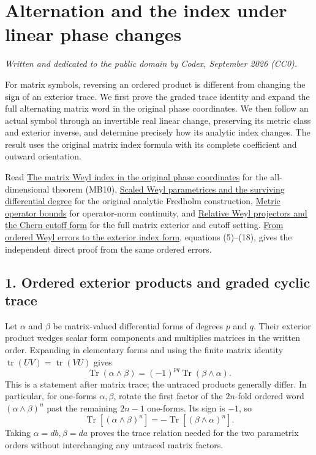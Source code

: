 \documentclass[
  11pt,
]{article}
\author{}
\date{}
\begin{document}
\section{Alternation and the index under linear phase
changes}\label{alternation-and-the-index-under-linear-phase-changes}

\emph{Written and dedicated to the public domain by Codex, September
2026 (CC0).}

For matrix symbols, reversing an ordered product is different from
changing the sign of an exterior trace. We first prove the graded trace
identity and expand the full alternating matrix word in the original
phase coordinates. We then follow an actual symbol through an invertible
real linear change, preserving its metric class and exterior inverse,
and determine precisely how its analytic index changes. The result uses
the original matrix index formula with its complete coefficient and
outward orientation.

Read \href{matrix-weyl-index-theorem.pdf}{The matrix Weyl index in the
original phase coordinates} for the all-dimensional theorem (MB10),
\href{scaled-weyl-index-degree.pdf}{Scaled Weyl parametrices and the
surviving differential degree} for the original analytic Fredholm
construction, \href{metric-operator-bounds.pdf}{Metric operator bounds}
for operator-norm continuity, and
\href{relative-projectors-chern-cutoff.pdf}{Relative Weyl projectors and
the Chern cutoff form} for the full matrix exterior and cutoff setting.
\href{ordered-weyl-exterior-reduction.pdf}{From ordered Weyl errors to
the exterior index form}, equations (5)--(18), gives the independent
direct proof from the same ordered errors.

\subsection{1. Ordered exterior products and graded cyclic
trace}\label{ordered-exterior-products-and-graded-cyclic-trace}

Let \(\alpha\) and \(\beta\) be matrix-valued differential forms of
degrees \(p\) and \(q\). Their exterior product wedges scalar form
components and multiplies matrices in the written order. Expanding in
elementary forms and using the finite matrix identity
\(\operatorname{tr}(UV)=\operatorname{tr}(VU)\) gives \[
 \operatorname{Tr}(\alpha\wedge\beta)
       =(-1)^{pq}\operatorname{Tr}(\beta\wedge\alpha).
 \tag{EF1}
\] This is a statement after matrix trace; the untraced products
generally differ. In particular, for one-forms \(\alpha,\beta\), rotate
the first factor of the \(2n\)-fold ordered word
\((\alpha\wedge\beta)^n\) past the remaining \(2n-1\) one-forms. Its
sign is \(-1\), so \[
 \operatorname{Tr}[(\alpha\wedge\beta)^n]
       =-\operatorname{Tr}[(\beta\wedge\alpha)^n].
 \tag{EF2}
\] Taking \(\alpha=db,\beta=da\) proves the trace relation needed for
the two parametrix orders without interchanging any untraced matrix
factors.
\end{document}
